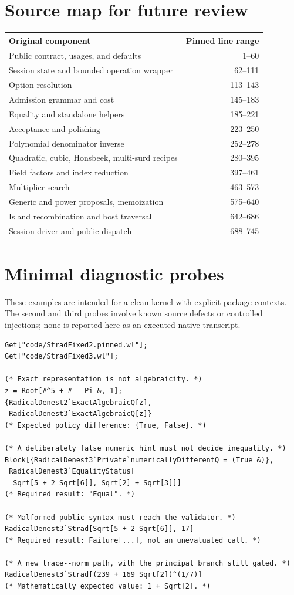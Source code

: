\documentclass[11pt,a4paper]{article}
\theoremstyle{remark}\newtheorem{remark}[theorem]{Remark}
\begin{document}
\section{Source map for future review}
\begin{center}\small
\begin{tabular}{@{}p{}r@{}}
\toprule Original component & Pinned line range\\\midrule
Public contract, usages, and defaults & 1--60\\
Session state and bounded operation wrapper & 62--111\\
Option resolution & 113--143\\
Admission grammar and cost & 145--183\\
Equality and standalone helpers & 185--221\\
Acceptance and polishing & 223--250\\
Polynomial denominator inverse & 252--278\\
Quadratic, cubic, Honsbeek, multi-surd recipes & 280--395\\
Field factors and index reduction & 397--461\\
Multiplier search & 463--573\\
Generic and power proposals, memoization & 575--640\\
Island recombination and host traversal & 642--686\\
Session driver and public dispatch & 688--745\\\bottomrule
\end{tabular}
\end{center}

\section{Minimal diagnostic probes}
These examples are intended for a clean kernel with explicit package contexts. The second and third probes involve known source defects or controlled injections; none is reported here as an executed native transcript.
\begin{lstlisting}
Get["code/StradFixed2.pinned.wl"];
Get["code/StradFixed3.wl"];

(* Exact representation is not algebraicity. *)
z = Root[#^5 + # - Pi &, 1];
{RadicalDenest2`ExactAlgebraicQ[z],
 RadicalDenest3`ExactAlgebraicQ[z]}
(* Expected policy difference: {True, False}. *)

(* A deliberately false numeric hint must not decide inequality. *)
Block[{RadicalDenest3`Private`numericallyDifferentQ = (True &)},
 RadicalDenest3`EqualityStatus[
  Sqrt[5 + 2 Sqrt[6]], Sqrt[2] + Sqrt[3]]]
(* Required result: "Equal". *)

(* Malformed public syntax must reach the validator. *)
RadicalDenest3`Strad[Sqrt[5 + 2 Sqrt[6]], 17]
(* Required result: Failure[...], not an unevaluated call. *)

(* A new trace--norm path, with the principal branch still gated. *)
RadicalDenest3`Strad[(239 + 169 Sqrt[2])^(1/7)]
(* Mathematically expected value: 1 + Sqrt[2]. *)
\end{lstlisting}
\end{document}
